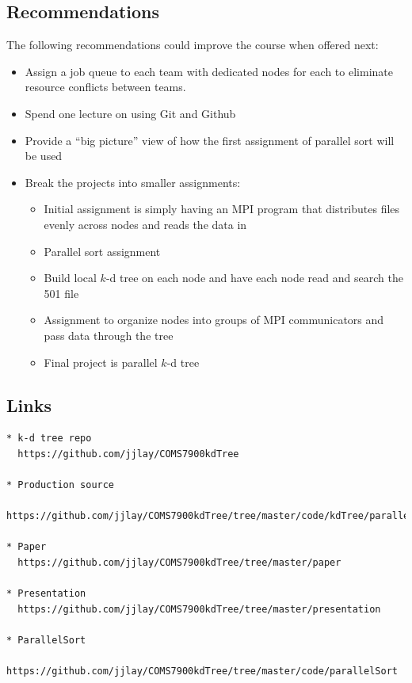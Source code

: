 \documentclass{article}
\begin{document}
\medskip

%
%

\subsection{Recommendations}

The following recommendations could improve the course when offered next:

\begin{itemize}
    \item Assign a job queue to each team with dedicated nodes for each to eliminate resource conflicts between teams.
    \item Spend one lecture on using Git and Github
    \item Provide a ``big picture'' view of how the first assignment of parallel sort will be used
    \item Break the projects into smaller assignments:
        \begin{itemize}
            \item Initial assignment is simply having an MPI program that distributes files evenly across nodes and reads the data in
            \item Parallel sort assignment
            \item Build local $k$-d tree on each node and have each node read and search the 501 file
            \item Assignment to organize nodes into groups of MPI communicators and pass data through the tree
            \item Final project is parallel $k$-d tree
        \end{itemize}
\end{itemize}


%
%

\subsection{Links}

\begin{verbatim}
* k-d tree repo
  https://github.com/jjlay/COMS7900kdTree

* Production source
  https://github.com/jjlay/COMS7900kdTree/tree/master/code/kdTree/parallelApproved

* Paper
  https://github.com/jjlay/COMS7900kdTree/tree/master/paper

* Presentation
  https://github.com/jjlay/COMS7900kdTree/tree/master/presentation
  
* ParallelSort
  https://github.com/jjlay/COMS7900kdTree/tree/master/code/parallelSort
\end{verbatim}
\end{document}
